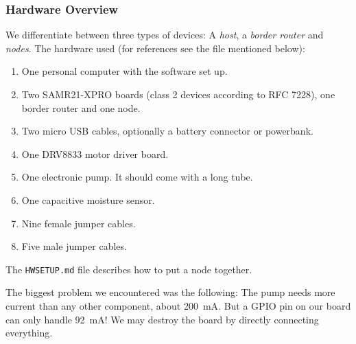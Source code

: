 \documentclass[10pt, xcolor=svgnames]{beamer}
\begin{document}
\begin{frame}
    \frametitle{Hardware Overview}

    We differentiate between three types of devices: A \emph{host}, a \emph{border router} and \emph{nodes}. The hardware used (for references see the file mentioned below):

    \begin{enumerate}
        \item One personal computer with the software set up.
        \item Two SAMR21-XPRO boards (class 2 devices according to RFC 7228), one border router and one node.
        \item Two micro USB cables, optionally a battery connector or powerbank.
        \item One DRV8833 motor driver board.
        \item One electronic pump. It should come with a long tube.
        \item One capacitive moisture sensor.
        \item Nine female jumper cables.
        \item Five male jumper cables.
    \end{enumerate}

    The \texttt{HWSETUP.md} file describes how to put a node together.    

    The biggest problem we encountered was the following: The pump needs more current than any other component, about \qty{200}{\milli\ampere}. But a GPIO pin on our board can only handle \qty{92}{\milli\ampere}! We may destroy the board by directly connecting everything.
\end{frame}
\end{document}

